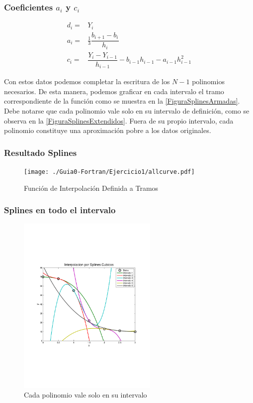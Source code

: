 \begin{frame}[label=FrameEquationRecurrencias]
  \frametitle<presentation>{Coeficientes $a_i$ y $c_i$}
  \begin{equation}
    \begin{aligned}
      d_i =& Y_i \\
      a_i =& \frac{1}{3} \dfrac{ b_{i+1} - b_i }{h_i} \\
      c_i =& \dfrac{ Y_i - Y_{i-1} }{ h_{i-1} } - b_{i-1} h_{i-1}  - a_{i-1} h_{i-1} ^2
    \end{aligned}
  \end{equation}


\end{frame}
Con estos datos podemos completar la escritura de los $N-1$ polinomios
necesarios. De esta manera, podemos graficar en cada intervalo 
el tramo correspondiente de la función como se muestra en la
\autoref{FiguraSplinesArmadas}. Debe notarse que cada polinomio vale solo
en su intervalo de definición, como se observa en la \autoref{FiguraSplinesExtendidos}.
Fuera de su propio intervalo, cada polinomio constituye una aproximación pobre
a los datos originales. 

\mode*
\begin{frame}[label=FrameFiguraSplinesArmadas]
  \frametitle<presentation>{Resultado Splines}
  \begin{figure}
    \center
    \texttt{[image: ./Guia0-Fortran/Ejercicio1/allcurve.pdf]}
    \caption{\label{FiguraSplinesArmadas}Función de Interpolación Definida a Tramos}
  \end{figure}
\end{frame}

\begin{frame}[label=FrameFiguraSplinesExtendidos]
  \frametitle<presentation>{Splines en todo el intervalo}
  \begin{figure}
    \center
    \includegraphics[width=0.6\textwidth,trim=1cm 7cm 1cm 6cm]{./scplines.pdf}
    \caption{\label{FiguraSplinesExtendidos} Cada polinomio vale solo en su intervalo}
  \end{figure}
\end{frame}

